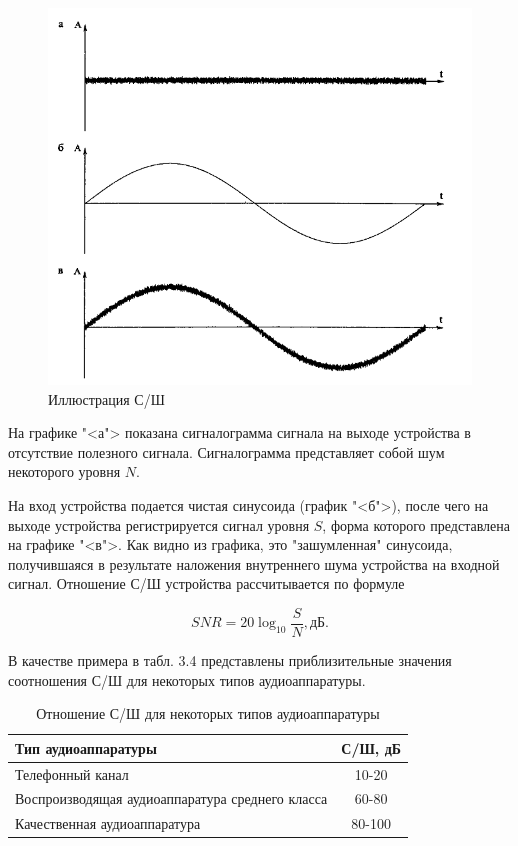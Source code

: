 \documentclass[oneside, final, 14pt]{extreport}
\begin{document}
\begin{figure}[h]
\centering
\includegraphics[scale=0.7]{pic-noise-06}
\caption{Иллюстрация С/Ш}
\label{pic-noise-06}
\end{figure}

На графике "<а"> показана сигналограмма сигнала на выходе устройства в отсутствие полезного сигнала. Сигналограмма представляет собой шум некоторого уровня $N$. 

На вход устройства подается чистая синусоида (график "<б">), после чего на выходе
устройства регистрируется сигнал уровня $S$, форма которого представлена на графике "<в">. Как видно из графика, это "зашумленная" синусоида, получившаяся в результате наложения внутреннего шума устройства на входной сигнал. Отношение
С/Ш устройства рассчитывается по формуле

\[SNR=20 \log_{10}{\frac{S}{N}}, \text{дБ.}\]

В качестве примера в табл. 3.4 представлены приблизительные значения соотношения С/Ш для некоторых типов аудиоаппаратуры.

\begin{table}[ht]
  \caption{Отношение С/Ш для некоторых типов аудиоаппаратуры}
  \begin{center}
  \begin{tabular}{|l|c|}
  \hline Тип аудиоаппаратуры & С/Ш, дБ \\
  \hline Телефонный канал & 10-20 \\
  \hline Воспроизводящая аудиоаппаратура среднего класса & 60-80 \\  
  \hline Качественная аудиоаппаратура & 80-100 \\  
  \hline
  \end{tabular}
  \end{center}  
  \label{table-noise-02}
\end{table}
\end{document}
